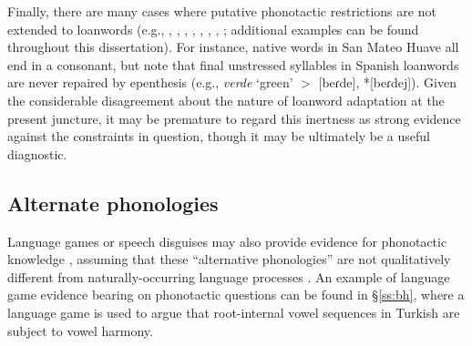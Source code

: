 
Finally, there are many cases where putative phonotactic restrictions are not extended to loanwords (e.g., \citealt{Clements1982}, \citealt[75]{Davidson1997}, \citealt{Fries1949}, \citealt{Holden1976}, \citealt{Ito1995a,Ito1995b}, \citealt[95]{Shibatani1973}, \citealt{Ussishkin2003}, \citealt{Vogt1954}; additional examples can be found throughout this dissertation).
For instance, native words in San Mateo Huave all end in a consonant, but 
\citet{Davidson1997} note that final unstressed syllables in Spanish loanwords are never repaired by epenthesis (e.g., \emph{verde} `green' $>$ [beɾde], *[beɾdej]).
Given the considerable disagreement about the nature of loanword adaptation at the present juncture, it may be premature to regard this inertness as strong evidence against the constraints in question, though it may be ultimately be a useful diagnostic.

\subsection{Alternate phonologies}

Language games or speech disguises may also provide evidence for phonotactic knowledge \citep[e.g.,][]{Vaux2011}, assuming that these ``alternative phonologies'' are not qualitatively different from naturally-occurring language processes \citep[e.g.,][697]{Bagemihl1995}.
An example of language game evidence bearing on phonotactic questions can be found in \S\ref{ss:bh}, where a language game is used to argue that root-internal vowel sequences in Turkish are subject to vowel harmony.

